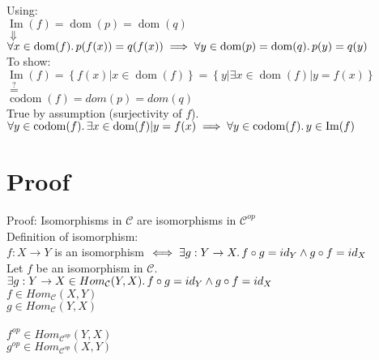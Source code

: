 \documentclass[a4paper, twoside, english, 11pt]{book}
\newcommand{\braces}[1] {\left \{ #1 \right \}}
\DeclareMathOperator{\dom}{dom}
\DeclareMathOperator{\codom}{codom}
\DeclareMathOperator{\Ima}{Im}
\newcommand{\C}{\mathcal C}
\begin{document}
\noindent
Using: \\

\noindent
$\Ima(f) = \dom(p) = \dom(q)$ \\
\indent\indent\indent
$\Downarrow$ \\ %
$\forall x \in \dom(f) \ldotp p(f(x)) = q(f(x)) \implies \forall y \in \dom(p) = \dom(q) \ldotp p(y) = q(y)$ \\

\noindent
To show: \\

$\Ima(f) = \braces{f(x) | x \in \dom(f)} = \braces{y | \exists x \in \dom(f) | y = f(x)}$ \\
\indent\indent\indent
$\stackrel{?}{=}$ \\
\indent
$\codom(f) = dom(p) = dom(q)$ \\

\noindent
True by assumption (surjectivity of $f$). \\

\noindent
$\forall y \in \codom(f) \ldotp \exists x \in \dom(f) | y = f(x) \implies \forall y \in \codom(f) \ldotp y \in \Ima(f)$



\section{Proof}

Proof: Isomorphisms in $\C$ are isomorphisms in $\C^{op}$ \\

\noindent
Definition of isomorphism: \\
\indent
$f : X \rightarrow Y$ is an isomorphism $\iff \exists g : Y \rightarrow X \ldotp f \circ g = id_Y \land g \circ f = id_X$ \\

\noindent
Let $f$ be an isomorphism in $\C$. \\

$\exists g : Y \rightarrow X \in Hom_\C(Y, X) \ldotp f \circ g = id_Y \land g \circ f = id_X$ \\

$f \in Hom_\C(X, Y)$ \\
\indent
$g \in Hom_\C(Y, X)$ \\\\

$f^{op} \in Hom_{\C^{op}}(Y, X)$ \\
\indent
$g^{op} \in Hom_{\C^{op}}(X, Y)$ \\\\
\end{document}
